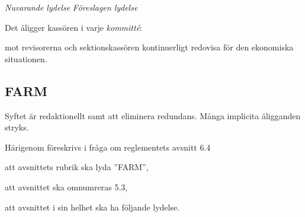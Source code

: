 \documentclass{article}
\newenvironment{lydelse}
    {\begin{paracol}{2}%
        \emph{Nuvarande lydelse}%
        \switchcolumn%
        \emph{Föreslagen lydelse}%
    \end{paracol}%
    \begin{enumerate}[label=\thesubsection.\arabic*]%
    \begin{paracol}{2}%
    }{\end{paracol}\end{enumerate}}
\begin{document}
\begin{lydelse}
    \item Det åligger kassören i varje \emph{kommitté}:
    \begin{aligganden}
        \vspace{-0.3em}
        \item mot revisorerna och sektionskassören kontinuerligt redovisa för den ekonomiska situationen.
    \end{aligganden}
\end{lydelse}
\subsection{FARM}
Syftet är redaktionellt samt att eliminera redundans.
Många implicita åligganden stryks.

Härigenom föreskrivs i fråga om reglementets avsnitt 6.4

\begin{dels}
    \item att avsnittets rubrik ska lyda ''FARM'',
    \item att avsnittet ska omnumreras 5.3,
    \item att avsnittet i sin helhet ska ha följande lydelse.
\end{dels}
\end{document}
